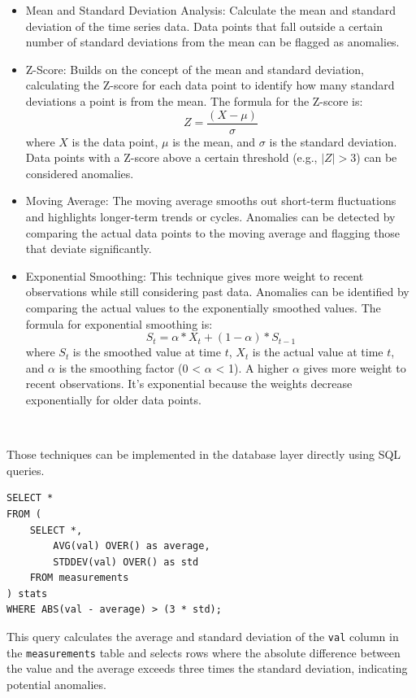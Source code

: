 \begin{itemize}
    \item Mean and Standard Deviation Analysis: Calculate the mean and standard deviation
          of the time series data. Data points that fall outside a certain number of
          standard deviations from the mean can be flagged as anomalies.
    \item Z-Score: Builds on the concept of the mean and standard deviation, calculating
          the Z-score for each data point to identify how many standard deviations a
          point is from the mean. The formula for the Z-score is:
          \[ Z = \frac{(X - \mu)}{\sigma} \]
          where \(X\) is the data point, \(\mu\) is the mean, and \(\sigma\) is the
          standard deviation. Data points with a Z-score above a certain threshold (e.g.,
          $|Z| > 3$) can be considered anomalies.
    \item Moving Average: The moving average smooths out short-term fluctuations and
          highlights longer-term trends or cycles. Anomalies can be detected by comparing
          the actual data points to the moving average and flagging those that deviate
          significantly.
    \item Exponential Smoothing: This technique gives more weight to recent observations
          while still considering past data. Anomalies can be identified by comparing the
          actual values to the exponentially smoothed values. The formula for exponential
          smoothing is:
          \[ S_t = \alpha * X_t + (1 - \alpha) * S_{t-1} \]
          where \(S_t\) is the smoothed value at time \(t\), \(X_t\) is the actual value
          at time \(t\), and \(\alpha\) is the smoothing factor (0 < \(\alpha\) < 1). A
          higher \(\alpha\) gives more weight to recent observations. It's exponential
          because the weights decrease exponentially for older data points.
\end{itemize}~\cite{AI&ML:24}

Those techniques can be implemented in the database layer directly using SQL
queries.

\begin{lstlisting}[language=PGTSSQL, caption=Anomaly Detection using Z-Score in TimescaleDB]
SELECT *
FROM (
    SELECT *,
        AVG(val) OVER() as average,
        STDDEV(val) OVER() as std
    FROM measurements
) stats
WHERE ABS(val - average) > (3 * std);
\end{lstlisting}

This query calculates the average and standard deviation of the \texttt{val} column in
the \texttt{measurements} table and selects rows where the absolute difference between
the value and the average exceeds three times the standard deviation,
indicating potential anomalies.

